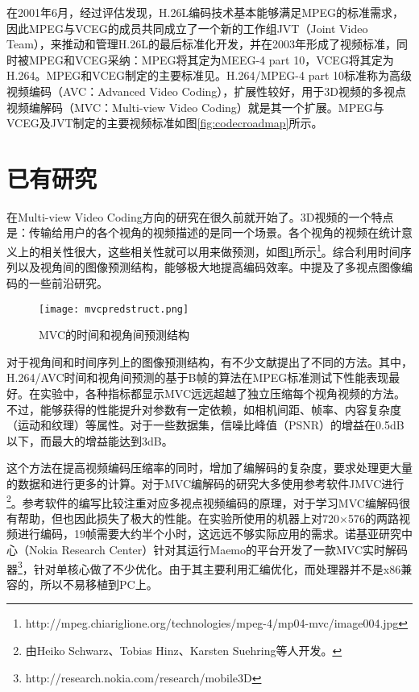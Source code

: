 在2001年6月，经过评估发现，H.26L编码技术基本能够满足MPEG的标准需求，因此MPEG与VCEG的成员共同成立了一个新的工作组JVT（Joint Video Team），来推动和管理H.26L的最后标准化开发，并在2003年形成了视频标准，同时被MPEG和VCEG采纳：MPEG将其定为MEEG-4 part 10，VCEG将其定为H.264。MPEG和VCEG制定的主要标准见。H.264/MPEG-4 part 10标准称为高级视频编码（AVC：Advanced Video Coding），扩展性较好，用于3D视频的多视点视频编解码（MVC：Multi-view Video Coding）就是其一个扩展。MPEG与VCEG及JVT制定的主要视频标准如图\ref{fig:codecroadmap}所示。

\section{已有研究}
\label{sec:previouswork}


在Multi-view Video Coding方向的研究在很久前就开始了。3D视频的一个特点是：传输给用户的各个视角的视频描述的是同一个场景。各个视角的视频在统计意义上的相关性很大，这些相关性就可以用来做预测，如图\ref{fig:mvcpredstruct}所示\footnote{http://mpeg.chiariglione.org/technologies/mpeg-4/mp04-mvc/image004.jpg}。综合利用时间序列以及视角间的图像预测结构，能够极大地提高编码效率\cite{merkle2005statistical}\cite{kaup2006analysis}。中提及了多视点图像编码的一些前沿研究。
\begin{figure}[htbp]
\begin{center}
\texttt{[image: mvcpredstruct.png]}
\caption{MVC的时间和视角间预测结构}
\label{fig:mvcpredstruct}
\end{center}
\end{figure}

对于视角间和时间序列上的图像预测结构，有不少文献提出了不同的方法。其中，H.264/AVC时间和视角间预测的基于B帧的算法\cite{kaup2006analysis}在MPEG标准测试下性能表现最好\cite{flierl2007motion}\cite{merkle2006efficient}\cite{mueller2006multi}\cite{merkle2007efficient}。在实验中，各种指标都显示MVC远远超越了独立压缩每个视角视频的方法。不过，能够获得的性能提升对参数有一定依赖，如相机间距、帧率、内容复杂度（运动和纹理）等属性。对于一些数据集，信噪比峰值（PSNR）的增益在0.5dB以下，而最大的增益能达到3dB。

这个方法在提高视频编码压缩率的同时，增加了编解码的复杂度，要求处理更大量的数据和进行更多的计算。对于MVC编解码的研究大多使用参考软件JMVC进行\footnote{由Heiko Schwarz、Tobias Hinz、Karsten Suehring等人开发。}。参考软件的编写比较注重对应多视点视频编码的原理，对于学习MVC编解码很有帮助，但也因此损失了极大的性能。在实验所使用的机器上对720$\times$576的两路视频进行编码，19帧需要大约半个小时，这远远不够实际应用的需求。诺基亚研究中心（Nokia Research Center）针对其运行Maemo的平台开发了一款MVC实时解码器\footnote{http://research.nokia.com/research/mobile3D}，针对单核心做了不少优化。由于其主要利用汇编优化，而处理器并不是x86兼容的，所以不易移植到PC上。

